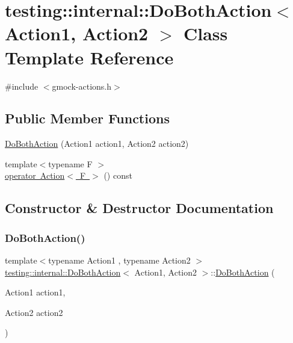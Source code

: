 \hypertarget{classtesting_1_1internal_1_1DoBothAction}{}\section{testing\+::internal\+::Do\+Both\+Action$<$ Action1, Action2 $>$ Class Template Reference}
\label{classtesting_1_1internal_1_1DoBothAction}


{\ttfamily \#include $<$gmock-\/actions.\+h$>$}

\subsection*{Public Member Functions}
\begin{DoxyCompactItemize}
\item 
\mbox{\hyperlink{classtesting_1_1internal_1_1DoBothAction_a55727c4dbdc1816ba6f1fe124e96088b}{Do\+Both\+Action}} (Action1 action1, Action2 action2)
\item 
{\footnotesize template$<$typename F $>$ }\\\mbox{\hyperlink{classtesting_1_1internal_1_1DoBothAction_a35733e2f117daad110bfbd3de84634a6}{operator Action$<$ F $>$}} () const
\end{DoxyCompactItemize}


\subsection{Constructor \& Destructor Documentation}
\mbox{\label{classtesting_1_1internal_1_1DoBothAction_a55727c4dbdc1816ba6f1fe124e96088b}} 
\subsubsection{\texorpdfstring{DoBothAction()}{DoBothAction()}}
{\footnotesize\ttfamily template$<$typename Action1 , typename Action2 $>$ \\
\mbox{\hyperlink{classtesting_1_1internal_1_1DoBothAction}{testing\+::internal\+::\+Do\+Both\+Action}}$<$ Action1, Action2 $>$\+::\mbox{\hyperlink{classtesting_1_1internal_1_1DoBothAction}{Do\+Both\+Action}} (\begin{DoxyParamCaption}\item[{Action1}]{action1,  }\item[{Action2}]{action2 }\end{DoxyParamCaption})\hspace{0.3cm}{\ttfamily [inline]}}



